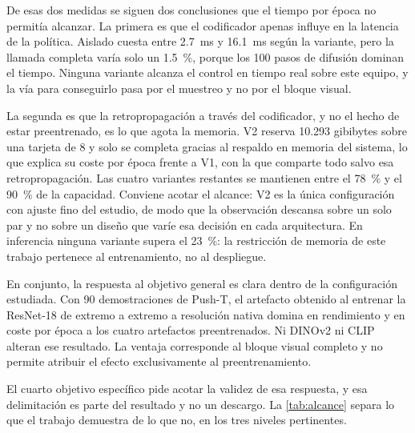 De esas dos medidas se siguen dos conclusiones que el tiempo por \'epoca no permit\'ia
alcanzar. La primera es que el codificador apenas influye en la latencia de la pol\'itica.
Aislado cuesta entre \SI{2.7}{\milli\second} y \SI{16.1}{\milli\second} seg\'un la variante,
pero la llamada completa var\'ia solo un \SI{1.5}{\percent}, porque los \num{100} pasos de
difusi\'on dominan el tiempo. Ninguna variante alcanza el control en tiempo real sobre este
equipo, y la v\'ia para conseguirlo pasa por el muestreo y no por el bloque visual.

La segunda es que la retropropagaci\'on a trav\'es del codificador, y no el hecho de estar
preentrenado, es lo que agota la memoria. V2 reserva \num{10.293} gibibytes sobre una
tarjeta de \num{8} y solo se completa gracias al respaldo en memoria del sistema, lo que
explica su coste por \'epoca frente a V1, con la que comparte todo salvo esa
retropropagaci\'on. Las cuatro variantes restantes se mantienen entre el \SI{78}{\percent}
y el \SI{90}{\percent} de la capacidad. Conviene acotar el alcance: V2 es la \'unica
configuraci\'on con ajuste fino del estudio, de modo que la observaci\'on descansa sobre un
solo par y no sobre un dise\~no que var\'ie esa decisi\'on en cada arquitectura. En
inferencia ninguna variante supera el \SI{23}{\percent}: la restricci\'on de memoria de
este trabajo pertenece al entrenamiento, no al despliegue.


En conjunto, la respuesta al objetivo general es clara dentro de la configuraci\'on
estudiada. Con \num{90} demostraciones de Push-T, el artefacto obtenido al entrenar la
ResNet-18 de extremo a extremo a resoluci\'on nativa domina en rendimiento y en coste por
\'epoca a los cuatro artefactos preentrenados. Ni DINOv2 \cite{oquab2024dinov2} ni CLIP
\cite{radford2021clip} alteran ese resultado. La ventaja corresponde al bloque visual
completo y no permite atribuir el efecto exclusivamente al preentrenamiento.

El cuarto objetivo espec\'ifico pide acotar la validez de esa respuesta, y esa delimitaci\'on
es parte del resultado y no un descargo. La \cref{tab:alcance} separa lo que el trabajo
demuestra de lo que no, en los tres niveles pertinentes.

